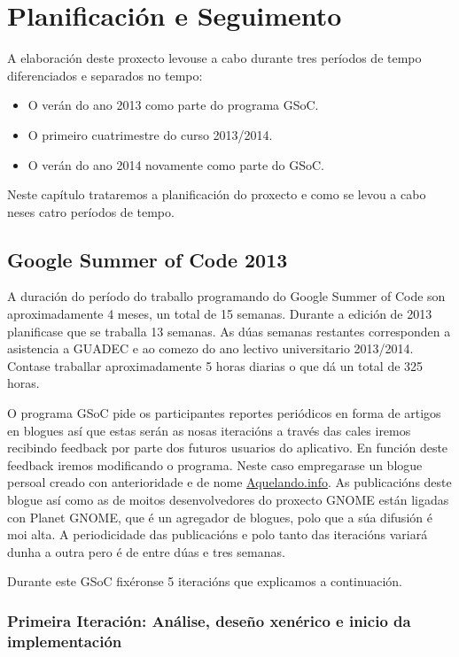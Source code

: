 \chapter{Planificación e Seguimento}

A elaboración deste proxecto levouse a cabo durante tres períodos de tempo diferenciados e separados no tempo:

\begin{itemize}
  \item O verán do ano 2013 como parte do programa GSoC.
  \item O primeiro cuatrimestre do curso 2013/2014.
  \item O verán do ano 2014 novamente como parte do GSoC.
\end{itemize}

Neste capítulo trataremos a planificación do proxecto e como se levou a cabo neses catro períodos de tempo.

\section{Google Summer of Code 2013}
A duración do período do traballo programando do Google Summer of Code son aproximadamente 4 meses, un total de 15 semanas. Durante a edición de 2013 planificase que se traballa 13 semanas. As dúas semanas restantes corresponden a asistencia a GUADEC e ao comezo do ano lectivo universitario 2013/2014. Contase traballar aproximadamente 5 horas diarias o que dá un total de 325 horas.

O programa GSoC pide os participantes reportes periódicos en forma de artigos en blogues así que estas serán as nosas iteracións a través das cales iremos recibindo feedback por parte dos futuros usuarios do aplicativo. En función deste feedback iremos modificando o programa. Neste caso empregarase un blogue persoal creado con anterioridade e de nome \href{http://aquelando.info}{Aquelando.info}. As publicacións deste blogue así como as de moitos desenvolvedores do proxecto GNOME están ligadas con Planet GNOME, que é un agregador de blogues, polo que a súa difusión é moi alta. A periodicidade das publicacións e polo tanto das iteracións variará dunha a outra pero é de entre dúas e tres semanas.

Durante este GSoC fixéronse 5 iteracións que explicamos a continuación.

\subsection{Primeira Iteración: Análise, deseño xenérico e inicio da implementación}

